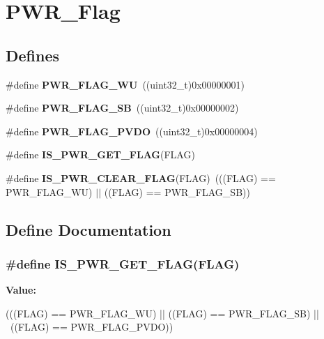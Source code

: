 \hypertarget{group__PWR__Flag}{
\section{PWR\_\-Flag}
\label{group__PWR__Flag}
}
\subsection*{Defines}
\begin{DoxyCompactItemize}
\item 
\hypertarget{group__PWR__Flag_ga2d06760a5769e729b06d41e37036d58e}{
\#define {\bfseries PWR\_\-FLAG\_\-WU}~((uint32\_\-t)0x00000001)}
\label{group__PWR__Flag_ga2d06760a5769e729b06d41e37036d58e}

\item 
\hypertarget{group__PWR__Flag_ga9e55f0b5dec2346d5c8dee3ab3c0c2df}{
\#define {\bfseries PWR\_\-FLAG\_\-SB}~((uint32\_\-t)0x00000002)}
\label{group__PWR__Flag_ga9e55f0b5dec2346d5c8dee3ab3c0c2df}

\item 
\hypertarget{group__PWR__Flag_gaefd05d58cc050eeef83a1b5c520b2c2a}{
\#define {\bfseries PWR\_\-FLAG\_\-PVDO}~((uint32\_\-t)0x00000004)}
\label{group__PWR__Flag_gaefd05d58cc050eeef83a1b5c520b2c2a}

\item 
\#define {\bfseries IS\_\-PWR\_\-GET\_\-FLAG}(FLAG)
\item 
\hypertarget{group__PWR__Flag_ga36d35a770e683e4a0baf3aac350fcb5a}{
\#define {\bfseries IS\_\-PWR\_\-CLEAR\_\-FLAG}(FLAG)~(((FLAG) == PWR\_\-FLAG\_\-WU) $|$$|$ ((FLAG) == PWR\_\-FLAG\_\-SB))}
\label{group__PWR__Flag_ga36d35a770e683e4a0baf3aac350fcb5a}

\end{DoxyCompactItemize}


\subsection{Define Documentation}
\hypertarget{group__PWR__Flag_gadc822638d0dd52d2f920808dd96c00a1}{
\subsubsection[{IS\_\-PWR\_\-GET\_\-FLAG}]{\setlength{\rightskip}{0pt plus 5cm}\#define IS\_\-PWR\_\-GET\_\-FLAG(FLAG)}}
\label{group__PWR__Flag_gadc822638d0dd52d2f920808dd96c00a1}
{\bfseries Value:}
\begin{DoxyCode}
(((FLAG) == PWR_FLAG_WU) || ((FLAG) == PWR_FLAG_SB) || \
                               ((FLAG) == PWR_FLAG_PVDO))
\end{DoxyCode}

